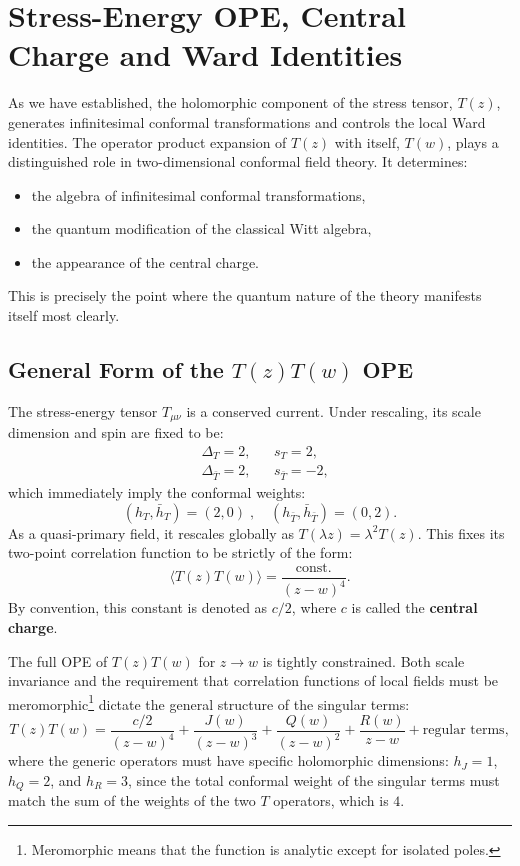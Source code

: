 \section{Stress-Energy OPE, Central Charge and Ward Identities}

As we have established, the holomorphic component of the stress tensor, \(T(z)\), generates infinitesimal conformal transformations and controls the local Ward identities. The operator product expansion of \(T(z)\) with itself, \(T(w)\), plays a distinguished role in two-dimensional conformal field theory. It determines:
\begin{itemize}
    \item the algebra of infinitesimal conformal transformations,
    \item the quantum modification of the classical Witt algebra,
    \item the appearance of the central charge.
\end{itemize}
This is precisely the point where the quantum nature of the theory manifests itself most clearly.

\subsection{General Form of the \(T(z)T(w)\) OPE}

The stress-energy tensor \(T_{\mu\nu}\) is a conserved current. Under rescaling, its scale dimension and spin are fixed to be:
\[
    \begin{aligned}
         & \Delta_T = 2,         &  & s_T = 2,          \\
         & \Delta_{\bar{T}} = 2, &  & s_{\bar{T}} = -2,
    \end{aligned}
\]
which immediately imply the conformal weights:
\[
    (h_T, \bar{h}_T) = (2,0) \;, \quad (h_{\bar{T}}, \bar{h}_{\bar{T}}) = (0,2).
\]
As a quasi-primary field, it rescales globally as \(T(\lambda z) = \lambda^2 T(z)\). This fixes its two-point correlation function to be strictly of the form:
\[
    \langle T(z)T(w) \rangle = \frac{\text{const.}}{(z-w)^4}.
\]
By convention, this constant is denoted as \(c/2\), where \(c\) is called the \textbf{central charge}.

The full OPE of \(T(z)T(w)\) for \(z \to w\) is tightly constrained. Both scale invariance and the requirement that correlation functions of local fields must be meromorphic\footnote{Meromorphic means that the function is analytic except for isolated poles.} dictate the general structure of the singular terms:
\[
    T(z)T(w) = \frac{c/2}{(z-w)^4} + \frac{J(w)}{(z-w)^3} + \frac{Q(w)}{(z-w)^2} + \frac{R(w)}{z-w} + \text{regular terms},
\]
where the generic operators must have specific holomorphic dimensions: \(h_J = 1\), \(h_Q = 2\), and \(h_R = 3\), since the total conformal weight of the singular terms must match the sum of the weights of the two \(T\) operators, which is \(4\).


